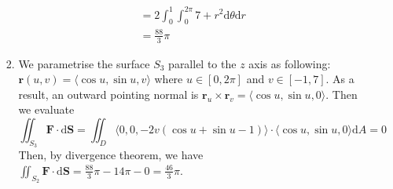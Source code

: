 \documentclass[12pt]{article}
\newcommand{\diff}{\mathrm{d}}
\theoremstyle{definition}
\begin{document}
\begin{enumerate}
\begin{enumerate}
\begin{enumerate}
\begin{align*}
  &=2\int_0^1\int_0^{2\pi}7+r^2\diff\theta\diff r\\
  &=\frac{88}{3}\pi
  \end{align*}
  \item We parametrise the surface $S_3$ parallel to the $z$ axis as following: $\mathbf{r}(u,v)=\langle \cos u, \sin u, v\rangle$ where $u\in[0,2\pi]$ and $v\in[-1,7]$. As a result, an outward pointing normal is $\mathbf{r}_u\times\mathbf{r}_v = \langle \cos u, \sin u, 0\rangle$. Then we evaluate
  \[
\iint_{S_3}\mathbf{F}\cdot\diff\mathbf{S}=\iint_D\langle 0,0,-2v(\cos u+\sin u-1)\rangle \cdot \langle \cos u, \sin u, 0\rangle\diff A = 0
  \]
  Then, by divergence theorem, we have $\iint_{S_2}\mathbf{F}\cdot\diff\mathbf{S}=\frac{88}{3}\pi-14\pi-0 = \frac{46}{3}\pi$.

\end{enumerate}
  \end{enumerate}
\end{enumerate}
\end{document}
